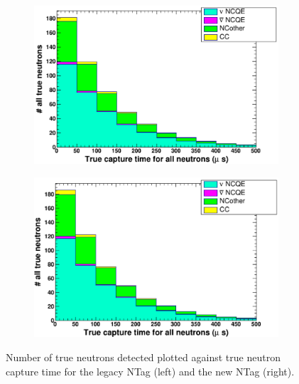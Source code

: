 \begin{figure}
    \centering
     \begin{subfigure}[b]{0.49\linewidth}
      \includegraphics[width=\linewidth]{Figures/TrueCapTimeReductionLegacy.PNG}
     \end{subfigure}
     \begin{subfigure}[b]{0.49\linewidth}
       \includegraphics[width=\linewidth]{Figures/TrueCapTimeReductionNew.PNG}
      \end{subfigure}
      \caption{Number of true neutrons detected plotted against true neutron capture time for the legacy NTag (left) and the new NTag (right).}
      \label{fig:TruCapTimeReduction}
\end{figure}

